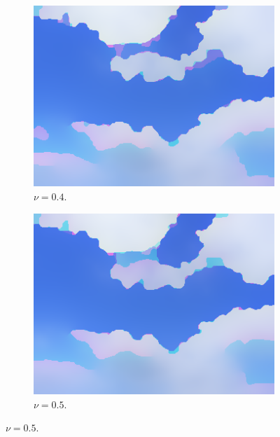 \documentclass[abstracton]{scrreprt}
\begin{document}
\begin{figure}[!ht]
\begin{subfigure}[b]{0.24\textwidth}
                    \includegraphics[width=\textwidth]{img/segmentation/rt/04blue.png}
                    \caption{$\nu = 0.4$.}
                \end{subfigure}
                \begin{subfigure}[b]{0.24\textwidth}
                    \includegraphics[width=\textwidth]{img/segmentation/rt/05blue.png}
                    \caption{$\nu = 0.5$.}
                \end{subfigure}

\end{figure}
\end{document}
